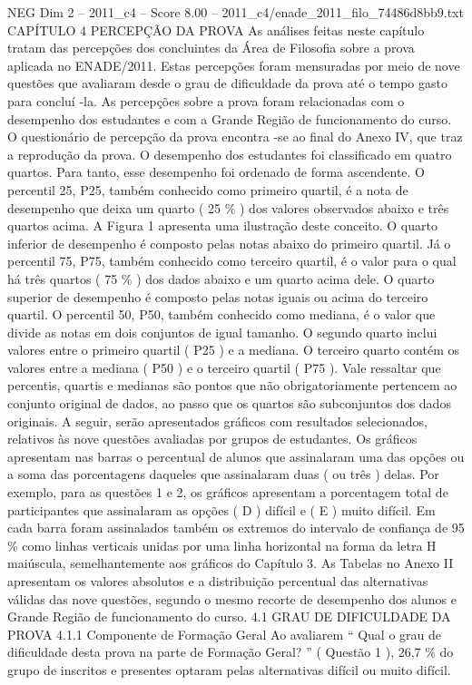 \begin{textsample}{NEG Dim 2 – 2011\_c4 – Score 8.00 – 2011\_c4/enade\_2011\_filo\_74486d8bb9.txt}  \label{ex:f2_neg_313}
CAPÍTULO 4 PERCEPÇÃO DA PROVA As análises feitas neste capítulo tratam das percepções dos concluintes da Área de Filosofia sobre a prova aplicada no ENADE/2011.
Estas percepções foram mensuradas por meio de nove questões que avaliaram desde o grau de dificuldade da prova até o tempo gasto para concluí -la.
As percepções sobre a prova foram relacionadas com o desempenho dos estudantes e com a Grande Região de funcionamento do curso.
O questionário de percepção da prova encontra -se ao final do Anexo IV, que traz a reprodução da prova.
O desempenho dos estudantes foi classificado em quatro quartos.
Para tanto, esse desempenho foi ordenado de forma ascendente.
O percentil 25, P25, também conhecido como primeiro quartil, é a nota de desempenho que deixa um quarto ( 25 \% ) dos valores observados abaixo e três quartos acima.
A Figura 1 apresenta uma ilustração deste conceito.
O quarto inferior de desempenho é composto pelas notas abaixo do primeiro quartil.
Já o percentil 75, P75, também conhecido como terceiro quartil, é o valor para o qual há três quartos ( 75 \% ) dos dados abaixo e um quarto acima dele.
O quarto superior de desempenho é composto pelas notas iguais ou acima do terceiro quartil.
O percentil 50, P50, também conhecido como mediana, é o valor que divide as notas em dois conjuntos de igual tamanho.
O segundo quarto inclui valores entre o primeiro quartil ( P25 ) e a mediana.
O terceiro quarto contém os valores entre a mediana ( P50 ) e o terceiro quartil ( P75 ).
Vale ressaltar que percentis, quartis e medianas são pontos que não obrigatoriamente pertencem ao conjunto original de dados, ao passo que os quartos são subconjuntos dos dados originais.
A seguir, serão apresentados gráficos com resultados selecionados, relativos às nove questões avaliadas por grupos de estudantes.
Os gráficos apresentam nas barras o percentual de alunos que assinalaram uma das opções ou a soma das porcentagens daqueles que assinalaram duas ( ou três ) delas.
Por exemplo, para as questões 1 e 2, os gráficos apresentam a porcentagem total de participantes que assinalaram as opções ( D ) difícil e ( E ) muito difícil.
Em cada barra foram assinalados também os extremos do intervalo de confiança de 95 \% como linhas verticais unidas por uma linha horizontal na forma da letra H maiúscula, semelhantemente aos gráficos do Capítulo 3.
As Tabelas no Anexo II apresentam os valores absolutos e a distribuição percentual das alternativas válidas das nove questões, segundo o mesmo recorte de desempenho dos alunos e Grande Região de funcionamento do curso. 4.1 GRAU DE DIFICULDADE DA PROVA 4.1.1 Componente de Formação Geral Ao avaliarem “ Qual o grau de dificuldade desta prova na parte de Formação Geral? ” ( Questão 1 ), 26,7 \% do grupo de inscritos e presentes optaram pelas alternativas difícil ou muito difícil.

\end{textsample}
